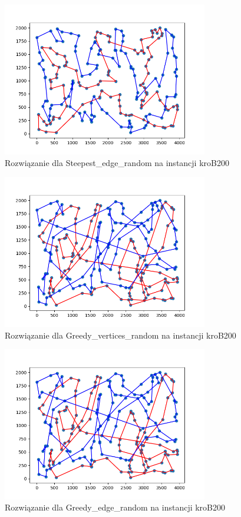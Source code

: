 \documentclass[12pt,a4paper]{article}
\begin{document}
\begin{figure}[H]
\centering
\includegraphics[width=0.8\textwidth]{figures/kroB_Steepest_E_random.png}
\caption{Rozwiązanie dla Steepest\_edge\_random na instancji kroB200}
\end{figure}

\begin{figure}[H]
\centering
\includegraphics[width=0.8\textwidth]{figures/kroB_Greedy_V_random.png}
\caption{Rozwiązanie dla Greedy\_vertices\_random na instancji kroB200}
\end{figure}

\begin{figure}[H]
\centering
\includegraphics[width=0.8\textwidth]{figures/kroB_Greedy_V_random.png}
\caption{Rozwiązanie dla Greedy\_edge\_random na instancji kroB200}
\end{figure}
\end{document}
